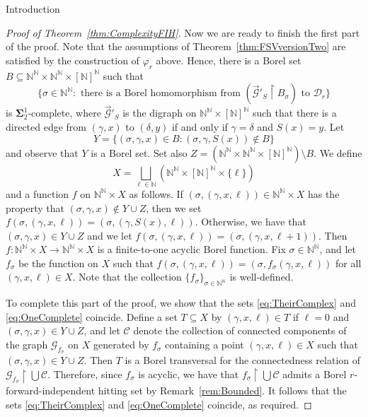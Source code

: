 \documentclass[psamsfonts]{amsart}
\theoremstyle{definition}
\newcommand{\N}{\mathbb N}
\theoremstyle{remark}
\numberwithin{equation}{section}
\newcommand{\rest}{\restriction}
\newcommand\mbf{\mathbf}
\newcommand\mcal{\mathcal}
\begin{document}
\begin{section}{Introduction}
\begin{proof}[Proof of Theorem~\ref{thm:ComplexityFIH}]
Now we are ready to finish the first part of the proof.
Note that the assumptions of Theorem~\ref{thm:FSVversionTwo} are satisfied by the construction of $\varphi_r$ above.
Hence, there is a Borel set $B\subseteq \N^\N\times \N^\N\times [\N]^\N$ such that 
    \begin{equation}\label{eq:TheirComplex}
        \{\sigma\in \N^\N: \text{ there is a Borel homomorphism from } (\overrightarrow{\mcal{G}}'_S \rest B_{\sigma}) \text{ to } \mcal{D}_r \}
    \end{equation}
is $\mbf{\Sigma}^1_2$-complete, where $\overrightarrow{\mcal{G}}'_S$ is the digraph on $\N^{\N} \times [\N]^{\N}$ such that there is a directed edge from $(\gamma, x)$ to $(\delta, y)$ if and only if $\gamma = \delta$ and $S(x) = y$.
Let
$$Y=\{(\sigma,\gamma,x)\in B:(\sigma,\gamma,S(x))\not\in B\}$$
and observe that $Y$ is a Borel set.
Set also $Z=(\N^\N\times \N^\N\times [\N]^\N)\setminus B$.
We define
$$X=\bigsqcup_{\ell\in \mathbb{N}} (\N^\N\times [\N]^\N\times \{\ell\})$$
and a function $f$ on $\mathbb{N}^\N\times X$ as follows.
If $(\sigma,(\gamma,x,\ell))\in \N^{\N} \times X$ has the property that $(\sigma,\gamma,x)\not\in Y\cup Z$, then we set $f(\sigma,(\gamma,x,\ell))=(\sigma,(\gamma,S(x),\ell))$.
Otherwise, we have that $(\sigma,\gamma,x)\in Y\cup Z$ and we let $f(\sigma,(\gamma,x,\ell))=(\sigma,(\gamma,x,\ell+1))$.
Then $f: \N^{\N} \times X\to \N^{\N} \times X$ is a finite-to-one acyclic Borel function. 
Fix $\sigma \in \N^{\N}$, and let $f_{\sigma}$ be the function on $X$ such that $f(\sigma, (\gamma, x, \ell)) = (\sigma, f_{\sigma}(\gamma, x, \ell))$ for all $(\gamma, x, \ell) \in X$.
Note that the collection $\{f_\sigma\}_{\sigma\in \mathbb{N}^\mathbb{N}}$ is well-defined.

To complete this part of the proof, we show that the sets \eqref{eq:TheirComplex} and \eqref{eq:OneComplete} coincide.
Define a set $T \subseteq X$ by $(\gamma, x, \ell) \in T$ if $\ell = 0$ and $(\sigma, \gamma, x) \in Y \cup Z$, and let $\mcal{C}$ denote the collection of connected components of the graph $\mcal{G}_{f_{\sigma}}$ on $X$ generated by $f_{\sigma}$ containing a point $(\gamma, x, \ell) \in X$ such that $(\sigma, \gamma, x) \in Y \cup Z$. Then $T$ is a Borel transversal for the connectedness relation of $\mcal{G}_{f_{\sigma}} \rest \bigcup \mcal{C}$. Therefore, since $f_{\sigma}$ is acyclic, we have that $f_{\sigma} \rest \bigcup \mcal{C}$ admits a Borel $r$-forward-independent hitting set by Remark~\ref{rem:Bounded}. It follows that the sets \eqref{eq:TheirComplex} and \eqref{eq:OneComplete} coincide, as required.


\end{proof}
\end{section}
\end{document}
